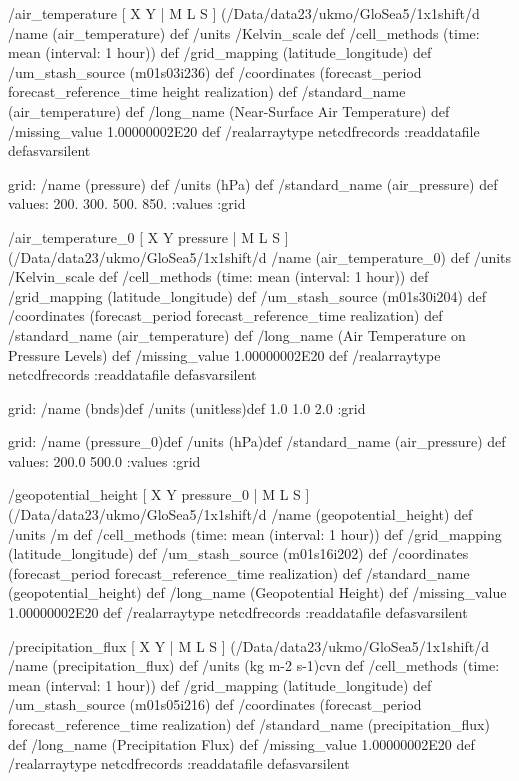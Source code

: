 \begin{ingrid}
 /air_temperature{
[ X Y | M L S ] (/Data/data23/ukmo/GloSea5/1x1shift/d%
/name (air_temperature) def
 /units /Kelvin_scale def
 /cell_methods (time: mean (interval: 1 hour)) def
 /grid_mapping (latitude_longitude) def
 /um_stash_source (m01s03i236) def
 /coordinates (forecast_period forecast_reference_time height realization) def
 /standard_name (air_temperature) def
 /long_name (Near-Surface Air Temperature) def
 /missing_value 1.00000002E20 def
 /realarraytype netcdfrecords :readdatafile
}defasvarsilent


grid:
/name (pressure) def
/units (hPa) def
/standard_name (air_pressure) def
values: 200. 300. 500. 850. :values
:grid


 /air_temperature_0{
[ X Y pressure | M L S ] (/Data/data23/ukmo/GloSea5/1x1shift/d%
/name (air_temperature_0) def
 /units /Kelvin_scale def
 /cell_methods (time: mean (interval: 1 hour)) def
 /grid_mapping (latitude_longitude) def
 /um_stash_source (m01s30i204) def
 /coordinates (forecast_period forecast_reference_time realization) def
 /standard_name (air_temperature) def
 /long_name (Air Temperature on Pressure Levels) def
 /missing_value 1.00000002E20 def
 /realarraytype netcdfrecords :readdatafile
}defasvarsilent


grid:
/name (bnds)def
/units (unitless)def
 1.0 1.0 2.0
:grid

grid:
/name (pressure_0)def
/units (hPa)def
/standard_name (air_pressure) def
values: 200.0 500.0 :values
:grid

 /geopotential_height{
[ X Y pressure_0 | M L S ] (/Data/data23/ukmo/GloSea5/1x1shift/d%
/name (geopotential_height) def
 /units /m def
 /cell_methods (time: mean (interval: 1 hour)) def
 /grid_mapping (latitude_longitude) def
 /um_stash_source (m01s16i202) def
 /coordinates (forecast_period forecast_reference_time realization) def
 /standard_name (geopotential_height) def
 /long_name (Geopotential Height) def
 /missing_value 1.00000002E20 def
 /realarraytype netcdfrecords :readdatafile
}defasvarsilent

 /precipitation_flux{
[ X Y | M L S ] (/Data/data23/ukmo/GloSea5/1x1shift/d%
/name (precipitation_flux) def
 /units (kg m-2 s-1)cvn def
 /cell_methods (time: mean (interval: 1 hour)) def
 /grid_mapping (latitude_longitude) def
 /um_stash_source (m01s05i216) def
 /coordinates (forecast_period forecast_reference_time realization) def
 /standard_name (precipitation_flux) def
 /long_name (Precipitation Flux) def
 /missing_value 1.00000002E20 def
 /realarraytype netcdfrecords :readdatafile
}defasvarsilent


\end{ingrid}
